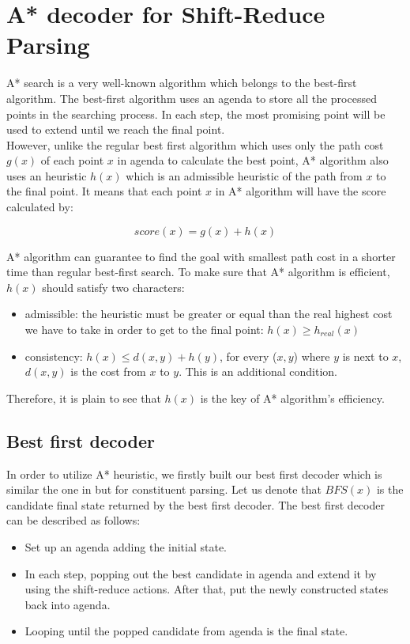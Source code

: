 \section{A* decoder for Shift-Reduce Parsing}
A* search is a very well-known algorithm which belongs to the best-first algorithm. The best-first algorithm uses an agenda to store all the processed points in the searching process. In each step, the most promising point will be used to extend until we reach the final point.\\
\indent However, unlike the regular best first algorithm which uses only the path cost $g(x)$ of each point $x$ in agenda to calculate the best point, A* algorithm also uses an heuristic $h(x)$ which is an admissible heuristic of the path from $x$ to the final point. It means that each point $x$ in A* algorithm will have the score calculated by:

\begin{equation}
	score(x) = g(x)+h(x)
\end{equation}

A* algorithm can guarantee to find the goal with smallest path cost in a shorter time than regular best-first search. To make sure that A* algorithm is efficient, $h(x)$ should satisfy two characters:
\begin{itemize}
	\item admissible: the heuristic must be greater or equal than the real highest cost we have to take in order to get to the final point: $h(x) \geq h_{real}(x)$
	\item consistency: $h(x) \leq d(x,y)+h(y)$, for every ($x,y$) where $y$ is next to $x$, $d(x,y)$ is the cost from $x$ to $y$. This is an additional condition.
\end{itemize}
Therefore, it is plain to see that $h(x)$ is the key of A* algorithm's efficiency.

\subsection{Best first decoder}
In order to utilize A* heuristic, we firstly built our best first decoder which is similar the one in \cite{2013Zhao} but for constituent parsing. Let us denote that $BFS(x)$ is the candidate final state returned by the best first decoder. The best first decoder can be described as follows:
\begin{itemize}
	\item Set up an agenda adding the initial state.
	\item In each step, popping out the best candidate in agenda and extend it by using the shift-reduce actions. After that, put the newly constructed states back into agenda.
	\item Looping until the popped candidate from agenda is the final state.
\end{itemize}

